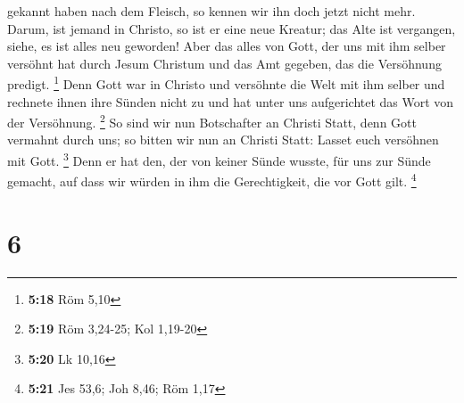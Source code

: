 gekannt haben nach dem Fleisch, so kennen wir ihn doch jetzt nicht mehr.
 Darum, ist jemand in Christo, so ist er eine neue
Kreatur; das Alte ist vergangen, siehe, es ist alles neu geworden!
 Aber das alles von Gott, der uns mit ihm selber versöhnt
hat durch Jesum Christum und das Amt gegeben, das die Versöhnung
predigt. \footnote{\textbf{5:18} Röm 5,10}  Denn Gott war
in Christo und versöhnte die Welt mit ihm selber und rechnete ihnen ihre
Sünden nicht zu und hat unter uns aufgerichtet das Wort von der
Versöhnung. \footnote{\textbf{5:19} Röm 3,24-25; Kol 1,19-20}
 So sind wir nun Botschafter an Christi Statt, denn Gott
vermahnt durch uns; so bitten wir nun an Christi Statt: Lasset euch
versöhnen mit Gott. \footnote{\textbf{5:20} Lk 10,16} 
Denn er hat den, der von keiner Sünde wusste, für uns zur Sünde gemacht,
auf dass wir würden in ihm die Gerechtigkeit, die vor Gott gilt.
\footnote{\textbf{5:21} Jes 53,6; Joh 8,46; Röm 1,17}

\hypertarget{section-5}{%
\section{6}\label{section-5}}

